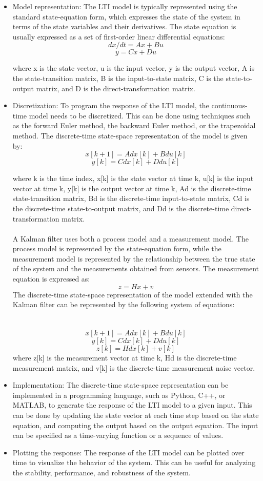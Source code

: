 \documentclass{article}
\begin{document}
\begin{itemize}
\item Model representation: The LTI model is typically represented using the standard state-equation form, which expresses the state of the system in terms of the state variables and their derivatives. The state equation is usually expressed as a set of first-order linear differential equations:
\[dx/dt = Ax + Bu\]
\[y = Cx + Du\]

where x is the state vector, u is the input vector, y is the output vector, A is the state-transition matrix, B is the input-to-state matrix, C is the state-to-output matrix, and D is the direct-transformation matrix.

\item Discretization: To program the response of the LTI model, the continuous-time model needs to be discretized. This can be done using techniques such as the forward Euler method, the backward Euler method, or the trapezoidal method. The discrete-time state-space representation of the model is given by:
\[x[k+1] = Ad x[k] + Bd u[k]\]
\[y[k] = Cd x[k] + Dd u[k]\]

where k is the time index, x[k] is the state vector at time k, u[k] is the input vector at time k, y[k] is the output vector at time k, Ad is the discrete-time state-transition matrix, Bd is the discrete-time input-to-state matrix, Cd is the discrete-time state-to-output matrix, and Dd is the discrete-time direct-transformation matrix. \\ \\
A Kalman filter uses both a process model and a measurement model. The process model is represented by the state-equation form, while the measurement model is represented by the relationship between the true state of the system and the measurements obtained from sensors. The measurement equation is expressed as:
\[z = Hx + v\]
The discrete-time state-space representation of the model extended with the Kalman filter can be represented by the following system of equations: \\ \\ \\
\[x[k+1] = Ad x[k] + Bd u[k]\]
\[y[k] = Cd x[k] + Dd u[k]\]
\[z[k] = Hd x[k] + v[k]\]
where z[k] is the measurement vector at time k, Hd is the discrete-time measurement matrix, and v[k] is the discrete-time measurement noise vector.
\item Implementation: The discrete-time state-space representation can be implemented in a programming language, such as Python, C++, or MATLAB, to generate the response of the LTI model to a given input. This can be done by updating the state vector at each time step based on the state equation, and computing the output based on the output equation. The input can be specified as a time-varying function or a sequence of values.

\item Plotting the response: The response of the LTI model can be plotted over time to visualize the behavior of the system. This can be useful for analyzing the stability, performance, and robustness of the system.
\end{itemize}
\end{document}
